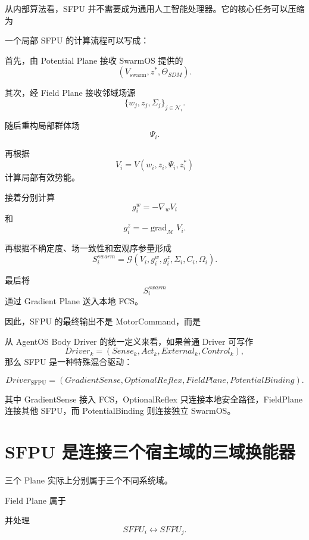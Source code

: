 从内部算法看，SFPU 并不需要成为通用人工智能处理器。它的核心任务可以压缩为
\begin{statementbox}
\centering
{}
\end{statementbox}

一个局部 SFPU 的计算流程可以写成：

首先，由 Potential Plane 接收 SwarmOS 提供的
\[
(
V_{\mathrm{swarm}},
z^*,
\Theta_{SDM}
).
\]

其次，经 Field Plane 接收邻域场源
\[
\{
w_j,z_j,\Sigma_j
\}_{j\in\mathcal N_i}.
\]

随后重构局部群体场
\[
\Psi_i.
\]

再根据
\[
V_i
=
V(
w_i,
z_i,
\Psi_i,
z_i^*
)
\]
计算局部有效势能。

接着分别计算
\[
g_i^w
=
-\nabla_wV_i
\]
和
\[
g_i^z
=
-\operatorname{grad}_{\mathcal M}V_i.
\]

再根据不确定度、场一致性和宏观序参量形成
\[
S_i^{swarm}
=
\mathcal G(
V_i,
g_i^w,
g_i^z,
\Sigma_i,
C_i,
\Omega_i
).
\]

最后将
\[
S_i^{swarm}
\]
通过 Gradient Plane 送入本地 FCS。

因此，SFPU 的最终输出不是 MotorCommand，而是
\begin{statementbox}
\centering
{}
\end{statementbox}

从 AgentOS Body Driver 的统一定义来看，如果普通 Driver 可写作
\[
Driver_k
=
(
Sense_k,
Act_k,
External_k,
Control_k
),
\]
那么 SFPU 是一种特殊混合驱动：

\[
Driver_{\mathrm{SFPU}}
=
(
GradientSense,
OptionalReflex,
FieldPlane,
PotentialBinding
).
\]

其中 GradientSense 接入 FCS，OptionalReflex 只连接本地安全路径，FieldPlane 连接其他 SFPU，而 PotentialBinding 则连接独立 SwarmOS。


\section{SFPU 是连接三个宿主域的三域换能器}

三个 Plane 实际上分别属于三个不同系统域。

Field Plane 属于
\begin{statementbox}
\centering
{}
\end{statementbox}
并处理
\[
SFPU_i
\leftrightarrow
SFPU_j.
\]


